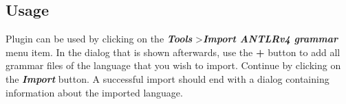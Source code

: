 \subsection{Usage}

Plugin can be used by clicking on the \textbf{\textit{Tools}} \textgreater \textbf{\textit{Import ANTLRv4 grammar}} menu item.
In the dialog that is shown afterwards, use the \textbf{+} button to add all grammar files of the language that you wish to import.
Continue by clicking on the \textbf{\textit{Import}} button.
A successful import should end with a dialog containing information about the imported language.


